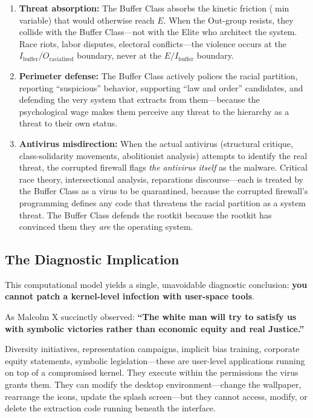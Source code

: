 \documentclass[12pt,openany]{book}
\begin{document}
\begin{enumerate}
    \item \textbf{Threat absorption:} The Buffer Class absorbs the kinetic friction ($\min$ variable) that would otherwise reach $E$. When the Out-group resists, they collide with the Buffer Class---not with the Elite who architect the system. Race riots, labor disputes, electoral conflicts---the violence occurs at the $I_{\text{buffer}} / O_{\text{racialized}}$ boundary, never at the $E / I_{\text{buffer}}$ boundary.

    \item \textbf{Perimeter defense:} The Buffer Class actively polices the racial partition, reporting ``suspicious'' behavior, supporting ``law and order'' candidates, and defending the very system that extracts from them---because the psychological wage makes them perceive any threat to the hierarchy as a threat to their own status.

    \item \textbf{Antivirus misdirection:} When the actual antivirus (structural critique, class-solidarity movements, abolitionist analysis) attempts to identify the real threat, the corrupted firewall flags \textit{the antivirus itself} as the malware. Critical race theory, intersectional analysis, reparations discourse---each is treated by the Buffer Class as a virus to be quarantined, because the corrupted firewall's programming defines any code that threatens the racial partition as a system threat. The Buffer Class defends the rootkit because the rootkit has convinced them they \textit{are} the operating system.
\end{enumerate}

\subsection{The Diagnostic Implication}

This computational model yields a single, unavoidable diagnostic conclusion: \textbf{you cannot patch a kernel-level infection with user-space tools}.

As Malcolm X succinctly observed: \textbf{``The white man will try to satisfy us with symbolic victories rather than economic equity and real Justice.''}

Diversity initiatives, representation campaigns, implicit bias training, corporate equity statements, symbolic legislation---these are user-level applications running on top of a compromised kernel. They execute within the permissions the virus grants them. They can modify the desktop environment---change the wallpaper, rearrange the icons, update the splash screen---but they cannot access, modify, or delete the extraction code running beneath the interface.
\end{document}

